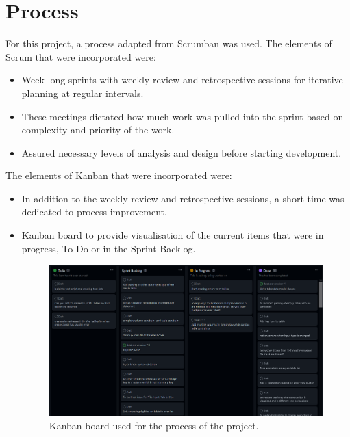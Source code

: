 \newpage

\section{Process}

For this project, a process adapted from Scrumban was used. The elements of Scrum that were incorporated were:  
\begin{itemize}
	\item Week-long sprints with weekly review and retrospective sessions for iterative planning at regular intervals.
	\item These meetings dictated how much work was pulled into the sprint based on complexity and priority of the work.
	\item Assured necessary levels of analysis and design before starting development.
\end{itemize}
The elements of Kanban that were incorporated were:
\begin{itemize}
	\item In addition to the weekly review and retrospective sessions, a short time was dedicated to process improvement.
	\item Kanban board to provide visualisation of the current items that were in progress, To-Do or in the Sprint Backlog.
	
	\begin{figure}[h!]
		\centering
		\includegraphics[width=\textwidth]{kanban}
		\caption{Kanban board used for the process of the project.}
		\label{fig:kanban}
	\end{figure}
\end{itemize}
